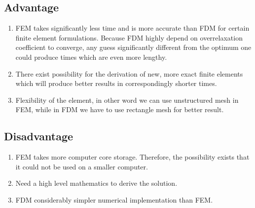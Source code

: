 \documentclass[a4paper,12pt]{article}
\begin{document}
\subsection{Advantage}
\begin{enumerate}
	\item FEM takes significantly less time and is more accurate than FDM for certain finite element formulations. Because FDM highly depend on overrelaxation coefficient to converge, any guess significantly different from the optimum one could produce times which are even more lengthy.
	\item There exist possibility for the derivation of new, more exact finite elements which will produce better results in correspondingly shorter times.
	\item Flexibility of the element, in other word we can use unstructured mesh in FEM, while in FDM we have to use rectangle mesh for better result.
\end{enumerate}
\subsection{Disadvantage}
\begin{enumerate}
	\item FEM takes more computer core storage. Therefore, the possibility exists that it could not be used on a smaller computer.
	\item Need a high level mathematics to derive the solution.
	\item FDM considerably simpler numerical implementation than FEM.
\end{enumerate}
\end{document}
